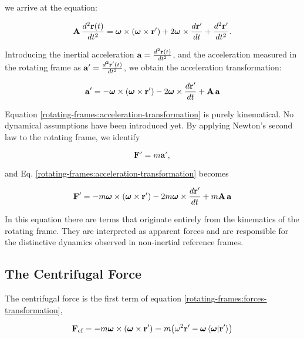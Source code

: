 \documentclass[12pt]{article}
\begin{document}
we arrive at the equation:

\[
  \vb{A}\,\frac{d^2\vb{r}(t)}{dt^2} =
    \boldsymbol{\omega}\times(\boldsymbol{\omega}\times\vb{r}')
    + 2\boldsymbol{\omega}\times\frac{d\vb{r}'}{dt}
    + \frac{d^2\vb{r}'}{dt^2}.
\]

Introducing the inertial acceleration $\vb{a} = \frac{d^2\vb{r}(t)}{dt^2}$, and
the acceleration measured in the rotating frame as $\vb{a}' = \frac{d^2\vb{r}'(t)}{dt^2}$, we obtain
the acceleration transformation:

\begin{equation}
  \vb{a}' = -\boldsymbol{\omega}\times(\boldsymbol{\omega}\times\vb{r}')
    - 2\boldsymbol{\omega}\times\frac{d\vb{r}'}{dt}
    + \vb{A}\,\vb{a}
  \label{rotating-frames:acceleration-transformation}
\end{equation}

Equation \eqref{rotating-frames:acceleration-transformation} is purely kinematical.
No dynamical assumptions have been introduced yet. By applying Newton's second law
to the rotating frame, we identify

\[
\mathbf F' = m\mathbf a',
\]

and Eq. \eqref{rotating-frames:acceleration-transformation} becomes

\begin{equation}
  \vb{F}' = -m\boldsymbol{\omega}\times(\boldsymbol{\omega}\times\vb{r}')
    - 2 m \boldsymbol{\omega}\times\frac{d\vb{r}'}{dt}
    + m\vb{A}\,\vb{a}
  \label{rotating-frames:forces-transformation}
\end{equation}

In this equation there are terms that originate entirely from the kinematics of
the rotating frame. They are interpreted as apparent forces and are responsible
for the distinctive dynamics observed in non-inertial reference frames.

\subsection{The Centrifugal Force}

The centrifugal force is the first term of equation \eqref{rotating-frames:forces-transformation},

\begin{equation}
  \vb{F}_\text{cf} = -m\boldsymbol{\omega}\times(\boldsymbol{\omega}\times\vb{r}')
    = m\bigl( \omega^2\vb{r}'-\boldsymbol{\omega}\ip{\boldsymbol{\omega}}{\vb{r}'} \bigr)
  \label{rotating-frames:centrifugal-force}
\end{equation}
\end{document}
